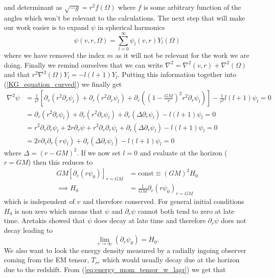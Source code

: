 \documentclass[12pt]{article}
\numberwithin{equation}{section}
\numberwithin{figure}{section}
\begin{document}
and determinant as $\sqrt{-g}=r^{2}f(\Omega)$ where $f$ is some arbitrary function of the angles which won't be relevant to the calculations. The next step that will make our work easier is to expand $\psi$ in spherical harmonics
\begin{equation}
	\psi(v,r, \Omega)= \sum_{l=0}^{\infty}\psi_{l}(v,r)Y_{l}(\Omega)
\end{equation}
where we have removed the index $m$ as it will not be relevant for the work we are doing. Finally we remind ourselves that we can write $\nabla^{2}=\nabla^{2}(v,r)+\nabla^{2}(\Omega)$ and that $r^{2}\nabla^{2}(\Omega)Y_{l}=-l(l+1)Y_{l}.$ Putting this information together into (\ref{KG_equation_curved}) we finally get
\begin{align}
	\nabla^{2}\psi&=\frac{1}{r^{2}}\left[\partial_{v}\left(r^{2}\partial_{r}\psi_{l}\right)	+\partial_{r}\left(r^{2}\partial_{v}\psi_{l}\right) + \partial_{r}\left(\left(1- \frac{GM}{r}\right)^{2}r^{2}\partial_{r}\psi_{l}\right) \right]- \frac{1}{r^{2}}l(l+1)\psi_{l}=0\\
	&=\partial_{v}\left(r^{2}\partial_{r}\psi_{l}\right)	+\partial_{r}\left(r^{2}\partial_{v}\psi_{l}\right) +\partial_{r}(\Delta\partial_{r}\psi_{l})-l(l+1)\psi_{l}=0\\
	&=r^{2}\partial_{v}\partial_{r}\psi_{l}+2r\partial_{v}\psi +r^{2}\partial_{v}\partial_{r}\psi_{l}+\partial_{r}(\Delta\partial_{r}\psi_{l})-l(l+1)\psi_{l}=0\\
	&=2r\partial_{v}\partial_{r}(r\psi_{l})+\partial_{r}(\Delta\partial_{r}\psi_{l})-l(l+1)\psi_{l}=0 \label{KG_rn_pert}
\end{align}
where $\Delta=(r-GM)^{2}$. If we now set $l=0$ and evaluate at the horizon ($r=GM$) then this reduces to
\begin{align}
	GM[\partial_{r}(r\psi_{0})]_{r=GM}&=\text{const}\equiv (GM)^{2}H_{0}\\
	\implies H_{0}&=\frac{1}{GM}\partial_{r}(r\psi_{0})_{r=GM}
\end{align}
which is independent of $v$ and therefore conserved. For general initial conditions $H_{0}$ is non zero which means that $\psi$ and $\partial_{r}\psi$ cannot both tend to zero at late time. Aretakis showed that $\psi$ does decay at late time and therefore $\partial_{r}\psi$ does not decay leading to
\begin{equation}
	 \lim_{v\to\infty}(\partial_{r}\psi_{0})= H_{0}.
\end{equation}
We also want to look the energy density measured by a radially ingoing observer coming from the EM tensor, $T_{rr}$ which would usually decay due at the horizon due to the redshift. From (\ref{eq:energy_mom_tensor_w_lagr}) we get that
\end{document}
